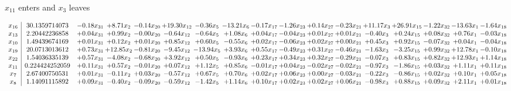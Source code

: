 \documentclass[9pt]{article}
\begin{document}
 $ x_{11} $ enters and $ x_{3} $ leaves 

 \[\begin{array}{c| c c@{\hskip 2pt} c@{\hskip 2pt} c@{\hskip 2pt} c@{\hskip 2pt} c@{\hskip 2pt} c@{\hskip 2pt} c@{\hskip 2pt} c@{\hskip 2pt} c@{\hskip 2pt} c@{\hskip 2pt} c@{\hskip 2pt} c@{\hskip 2pt} c@{\hskip 2pt} c@{\hskip 2pt} c@{\hskip 2pt} }
 x_{16}   &  30.1359714073 & -0.18 x_{31} & +  8.71 x_{2} & -0.14 x_{20} & + 19.30 x_{12} & -0.36 x_{5} & -13.21 x_{6} & -0.17 x_{17} & -1.26 x_{23} & +  0.14 x_{27} & -0.23 x_{21} & + 11.17 x_{3} & + 26.91 x_{15} & -1.22 x_{32} & -13.63 x_{1} & -1.64 x_{18}\\
 x_{13}   &  2.20442236858 & +  0.04 x_{31} & +  0.99 x_{2} & -0.00 x_{20} & -0.64 x_{12} & -0.64 x_{5} & +  1.08 x_{6} & +  0.04 x_{17} & -0.04 x_{23} & +  0.01 x_{27} & +  0.01 x_{21} & -0.40 x_{3} & +  0.24 x_{15} & +  0.08 x_{32} & +  0.76 x_{1} & -0.03 x_{18}\\
 x_{10}   &  1.49439674169 & +  0.01 x_{31} & +  0.12 x_{2} & +  0.01 x_{20} & +  0.85 x_{12} & +  0.60 x_{5} & -0.55 x_{6} & +  0.02 x_{17} & -0.06 x_{23} & +  0.02 x_{27} & +  0.00 x_{21} & +  0.45 x_{3} & +  0.92 x_{15} & -0.07 x_{32} & +  0.04 x_{1} & -0.04 x_{18}\\
 x_{19}   &  20.0713013612 & +  0.73 x_{31} & + 12.85 x_{2} & -0.81 x_{20} & -9.45 x_{12} & -13.94 x_{5} & +  3.93 x_{6} & +  0.55 x_{17} & -0.49 x_{23} & +  0.31 x_{27} & -0.46 x_{21} & -1.63 x_{3} & -3.25 x_{15} & +  0.99 x_{32} & + 12.78 x_{1} & -0.10 x_{18}\\
 x_{22}   &  1.54036335139 & +  0.57 x_{31} & -4.08 x_{2} & -0.68 x_{20} & +  3.92 x_{12} & +  0.50 x_{5} & -0.93 x_{6} & +  0.23 x_{17} & +  0.34 x_{23} & +  0.32 x_{27} & -0.29 x_{21} & -0.07 x_{3} & +  0.83 x_{15} & +  0.82 x_{32} & + 12.93 x_{1} & +  1.14 x_{18}\\
 x_{11}   &  0.224424252059 & +  0.11 x_{31} & +  0.57 x_{2} & -0.01 x_{20} & +  0.07 x_{12} & +  1.12 x_{5} & +  0.85 x_{6} & -0.01 x_{17} & +  0.04 x_{23} & -0.02 x_{27} & -0.02 x_{21} & -0.97 x_{3} & -1.86 x_{15} & +  0.03 x_{32} & +  1.11 x_{1} & +  0.11 x_{18}\\
 x_{7}   &  2.67400750531 & +  0.01 x_{31} & -0.11 x_{2} & +  0.03 x_{20} & -0.57 x_{12} & +  0.67 x_{5} & +  0.70 x_{6} & +  0.02 x_{17} & +  0.06 x_{23} & +  0.00 x_{27} & -0.03 x_{21} & -0.22 x_{3} & -0.86 x_{15} & +  0.02 x_{32} & +  0.10 x_{1} & +  0.05 x_{18}\\
 x_{8}   &  1.14091115892 & +  0.09 x_{31} & -0.40 x_{2} & -0.09 x_{20} & -0.59 x_{12} & -1.42 x_{5} & +  1.14 x_{6} & +  0.10 x_{17} & +  0.02 x_{23} & +  0.02 x_{27} & +  0.06 x_{21} & -0.98 x_{3} & +  0.88 x_{15} & +  0.09 x_{32} & +  2.11 x_{1} & +  0.01 x_{18}\\

\end{array}\]
\end{document}
